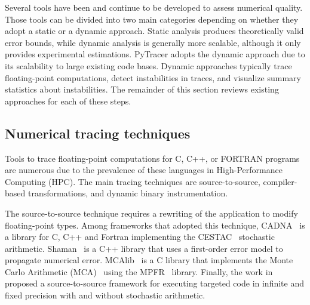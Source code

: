 \documentclass[11pt]{article}
\newcommand{\pytracer}[0]{PyTracer\xspace}
\begin{document}
Several tools have been and continue to be developed to assess numerical quality. Those tools can be divided into two main categories depending on whether they adopt a static or a dynamic approach.
Static analysis produces theoretically valid error bounds, while dynamic analysis is generally more scalable, although it only provides experimental estimations.
\pytracer adopts the dynamic approach due to its scalability to large existing code bases. Dynamic approaches typically trace floating-point computations, detect instabilities in traces, and visualize summary statistics about instabilities. The remainder of this section reviews existing approaches for each of these steps. 


\label{sec:soa}
\subsection{Numerical tracing techniques}
Tools to trace floating-point computations for C, C++, or FORTRAN programs are numerous due to the prevalence of these languages in High-Performance Computing (HPC). 
The main tracing techniques are source-to-source, compiler-based transformations, and dynamic binary instrumentation.

The source-to-source technique requires a rewriting of the application to modify floating-point types. Among frameworks that adopted this technique,
CADNA~\cite{jezequel2008cadna} is a library for C, C++ and Fortran implementing the CESTAC~\cite{vignes1993stochastic} stochastic arithmetic.
Shaman~\cite{demeure_phd} is a C++ library that uses a first-order error model to propagate numerical error. 
MCAlib~\cite{frechtling2015mcalib} is a C library that implements the Monte Carlo Arithmetic (MCA)~\cite{parker1997monte} using the MPFR~\cite{fousse2007mpfr} library.
Finally, the work in~\cite{tang2016software} proposed a source-to-source framework for executing targeted code in infinite and fixed precision with and without  stochastic arithmetic.
\end{document}
